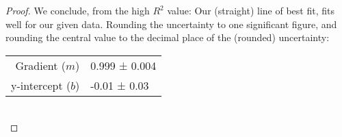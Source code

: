 \documentclass[../../main.tex]{subfiles}
\begin{document}
\begin{proof}
We conclude, from the high $R^2$ value: Our (straight) line of best fit, fits  well for our given data. Rounding the uncertainty to one significant figure, and rounding the central value to the decimal place of the (rounded) uncertainty:
\begin{tabular}{@{}r|l@{}}
\toprule Gradient ($m$) & 0.999 ± 0.004\\
y-intercept ($b$) & -0.01 ± 0.03\\
\bottomrule
\end{tabular}
\label{tab:fitdata}\\[2ex]
\end{proof}
\end{document}
